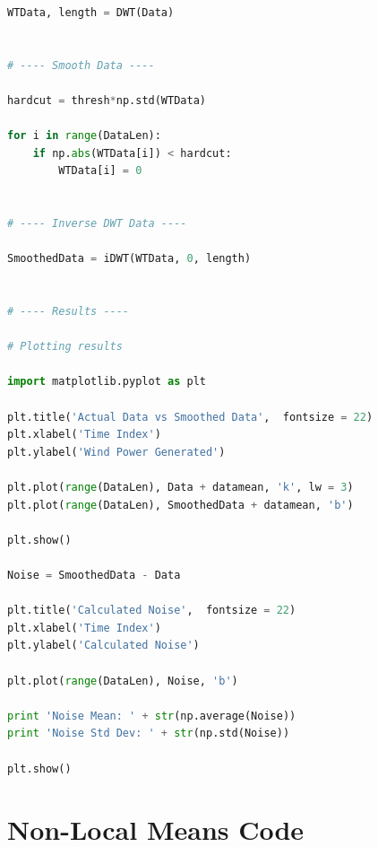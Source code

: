 \documentclass[11pt]{article}
\theoremstyle{definition}
\begin{document}
\begin{lstlisting}[language = Python]
WTData, length = DWT(Data)


# ---- Smooth Data ----

hardcut = thresh*np.std(WTData)

for i in range(DataLen):
    if np.abs(WTData[i]) < hardcut:
        WTData[i] = 0


# ---- Inverse DWT Data ----

SmoothedData = iDWT(WTData, 0, length)


# ---- Results ----

# Plotting results

import matplotlib.pyplot as plt

plt.title('Actual Data vs Smoothed Data',  fontsize = 22)
plt.xlabel('Time Index')
plt.ylabel('Wind Power Generated')

plt.plot(range(DataLen), Data + datamean, 'k', lw = 3)
plt.plot(range(DataLen), SmoothedData + datamean, 'b')

plt.show()

Noise = SmoothedData - Data

plt.title('Calculated Noise',  fontsize = 22)
plt.xlabel('Time Index')
plt.ylabel('Calculated Noise')

plt.plot(range(DataLen), Noise, 'b')

print 'Noise Mean: ' + str(np.average(Noise))
print 'Noise Std Dev: ' + str(np.std(Noise))

plt.show()

\end{lstlisting}

\pagebreak


\section{Non-Local Means Code}
\end{document}

